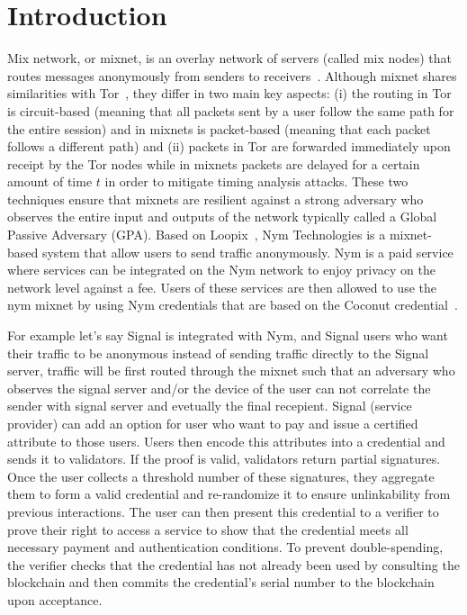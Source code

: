 \section{Introduction}

Mix network, or mixnet, is an overlay network of servers (called mix nodes) that routes messages anonymously from senders
to receivers~\cite{chaum-mix,cypherpunk-remailer,piotrowska2017loopix,nym-network-whitepaper,minion-design, van2015vuvuzela,mixmaster-spec,chaum2016cmix}. Although mixnet shares similarities with Tor~\cite{onion-routing96}, they differ in two main key aspects: (i) the routing in Tor is circuit-based (meaning that all packets sent by a user follow the same path for the entire session) and in mixnets is packet-based (meaning that each packet follows a different path) and (ii) packets in Tor are forwarded immediately upon receipt by the Tor nodes while in mixnets packets are delayed for a certain amount of time $t$ in order to mitigate timing analysis attacks. These two techniques ensure that mixnets are resilient against a strong adversary who observes the entire input and outputs of the network typically called a Global Passive Adversary (GPA).
Based on Loopix~\cite{piotrowska2017loopix}, Nym Technologies is a mixnet-based system that allow users to send traffic anonymously.
Nym is a paid service where services can be integrated on the Nym network to enjoy privacy on the network level against a fee. Users of these services are then allowed to use the nym mixnet by using Nym credentials that are based on the Coconut credential~\cite{coconut}. 

For example let's say Signal is integrated with Nym, and Signal users who want their traffic to be anonymous instead of sending traffic directly to the Signal server, traffic will be first routed through the mixnet such that an adversary who observes the signal server and/or the device of the user can not correlate the sender with signal server and evetually the final recepient. Signal (service provider) can add an option for user who want to pay and issue a certified attribute to those users. Users then encode this attributes into a credential and sends it to validators. If the proof is valid, validators return partial signatures. Once the user collects a threshold number of these signatures, they aggregate them to form a valid credential and re-randomize it to ensure unlinkability from previous interactions. The user can then present this credential to a verifier to prove their right to access a service to show that the credential meets all necessary payment and authentication conditions. To prevent double-spending, the verifier checks that the credential has not already been used by consulting the blockchain and then commits the credential's serial number to the blockchain upon acceptance.

